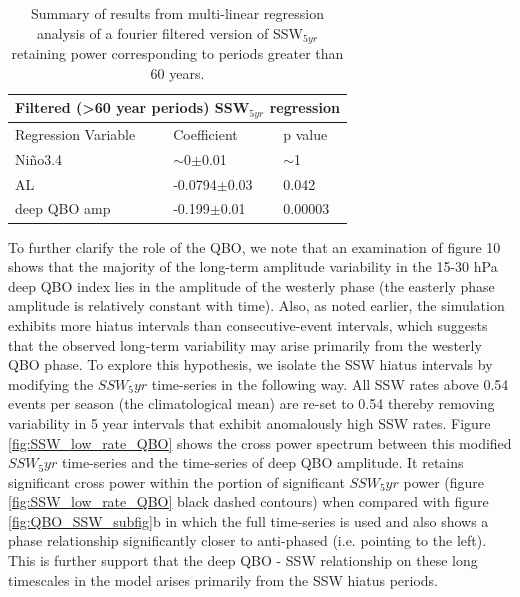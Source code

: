 \begin{table}
\centering
\begin{tabular}{|p{3cm}||p{3cm}|p{3cm}|}
 \hline
 \multicolumn{3}{|c|}{Filtered (>60 year periods) SSW$_{5yr}$ regression}\\
 \hline
 Regression Variable& Coefficient& p value\\
 \hline
 Ni\~{n}o3.4  &   $\sim$0$\pm$0.01  & $\sim$1\\
 AL & -0.0794$\pm$0.03& 0.042\\
 deep QBO amp &-0.199$\pm$0.01&0.00003\\
 \hline
\end{tabular}
\begin{center}
\caption{Summary of results from multi-linear regression analysis of a fourier filtered version of SSW$_{5yr}$ retaining power corresponding to periods greater than 60 years.}  
\end{center}
\end{table}


To further clarify the role of the QBO, we note that an examination of figure 10 shows that the majority of the long-term amplitude variability in the 15-30 hPa deep QBO index lies in the amplitude of the westerly phase (the easterly phase amplitude is relatively constant with time). Also, as noted earlier, the simulation exhibits more hiatus intervals than consecutive-event intervals, which suggests that the observed long-term variability may arise primarily from the westerly QBO phase. To explore this hypothesis, we isolate the SSW  hiatus intervals by modifying the $SSW_5yr$ time-series in the following way. All SSW rates above 0.54 events per season (the climatological mean) are re-set to 0.54 thereby removing variability in 5 year intervals that exhibit anomalously high SSW rates. Figure \ref{fig:SSW_low_rate_QBO} shows the cross power spectrum between this modified $SSW_5yr$ time-series and the time-series of deep QBO amplitude. It retains significant cross power within the portion of significant $SSW_5yr$ power (figure \ref{fig:SSW_low_rate_QBO} black dashed contours) when compared with figure \ref{fig:QBO_SSW_subfig}b in which the full time-series is used and also shows a phase relationship significantly closer to anti-phased (i.e. pointing to the left). This is further support that the deep QBO - SSW relationship  on these long timescales in the model arises primarily from the SSW hiatus periods. 


